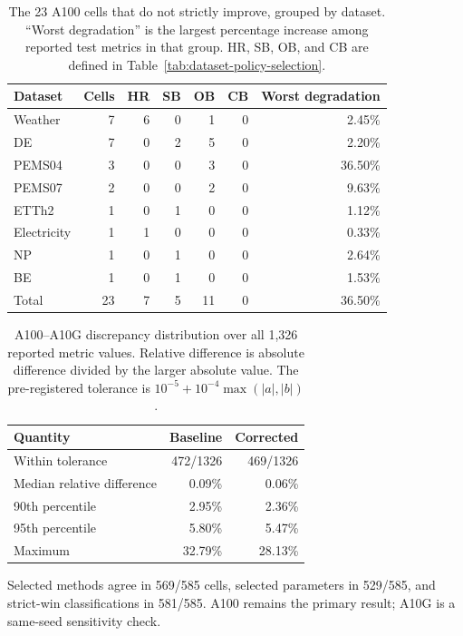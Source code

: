 \begin{table}[h]
\centering
\small
\setlength{\tabcolsep}{4pt}
\caption{The 23 A100 cells that do not strictly improve, grouped by dataset.
``Worst degradation'' is the largest percentage increase among reported test
metrics in that group. HR, SB, OB, and CB are defined in
Table~\ref{tab:dataset-policy-selection}.}
\label{tab:non-strict-cells}
\begin{tabular}{lrrrrrr}
\toprule
Dataset & Cells & HR & SB & OB & CB & Worst degradation\\
\midrule
Weather     & 7 & 6 & 0 & 1 & 0 & 2.45\%\\
DE          & 7 & 0 & 2 & 5 & 0 & 2.20\%\\
PEMS04      & 3 & 0 & 0 & 3 & 0 & 36.50\%\\
PEMS07      & 2 & 0 & 0 & 2 & 0 & 9.63\%\\
ETTh2       & 1 & 0 & 1 & 0 & 0 & 1.12\%\\
Electricity & 1 & 1 & 0 & 0 & 0 & 0.33\%\\
NP          & 1 & 0 & 1 & 0 & 0 & 2.64\%\\
BE          & 1 & 0 & 1 & 0 & 0 & 1.53\%\\
\midrule
Total       & 23 & 7 & 5 & 11 & 0 & 36.50\%\\
\bottomrule
\end{tabular}
\end{table}

\begin{table}[h]
\centering
\small
\caption{A100--A10G discrepancy distribution over all 1,326 reported metric
values. Relative difference is absolute difference divided by the larger
absolute value. The pre-registered tolerance is
$10^{-5}+10^{-4}\max(|a|,|b|)$.}
\label{tab:hardware-consistency}
\begin{tabular}{lrr}
\toprule
Quantity & Baseline & Corrected\\
\midrule
Within tolerance & 472/1326 & 469/1326\\
Median relative difference & 0.09\% & 0.06\%\\
90th percentile & 2.95\% & 2.36\%\\
95th percentile & 5.80\% & 5.47\%\\
Maximum & 32.79\% & 28.13\%\\
\bottomrule
\end{tabular}
\end{table}

Selected methods agree in 569/585 cells, selected parameters in 529/585, and
strict-win classifications in 581/585. A100 remains the primary result; A10G
is a same-seed sensitivity check.
